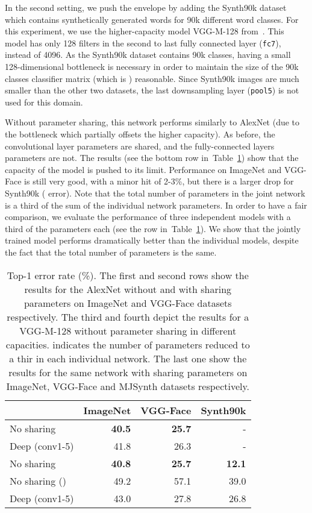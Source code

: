 \documentclass[10pt,twocolumn,letterpaper]{article}
\begin{document}
In the second setting, we push the envelope by adding the Synth90k dataset which contains synthetically generated words for 90k different word classes. For this experiment, we use the higher-capacity model VGG-M-128 from~\cite{chatfield14return}. This model has only 128 filters in the second to last fully connected layer (\texttt{fc7}), instead of 4096. As the Synth90k dataset contains 90k classes, having a small 128-dimensional bottleneck is necessary in order to maintain the size  of the 90k classes classifier matrix (which is ) reasonable. Since Synth90k images are much smaller than the other two datasets, the last downsampling layer ({\tt pool5}) is not used for this domain.

Without parameter sharing, this network performs similarly to AlexNet (due to the bottleneck which partially offsets the higher capacity). As before, the convolutional layer parameters are shared, and the fully-connected layers parameters are not. The results (see the bottom row in~Table~\ref{tab:largedatasets}) show that the capacity of the model is pushed to its limit. Performance on ImageNet and VGG-Face is still very good, with a minor hit of 2-3\%, but there is a larger drop for Synth90k ( error). Note that the total number of parameters in the joint network is a third of the sum of the individual network parameters. In order to have a fair comparison, we evaluate the performance of three independent models with a third of the parameters each (see the  row in~Table~\ref{tab:largedatasets}). We show that the jointly trained model performs dramatically better than the individual models, despite the fact that the total number of parameters is the same.


\begin{table}
  \centering
  \begin{tabular}{lrrr}
	  \toprule
    & ImageNet & VGG-Face & Synth90k\\
    \midrule
  No sharing & \bf{40.5} & \bf{25.7} & -\\
  Deep (conv1-5) & 41.8 & 26.3 & -\\
  \midrule
  No sharing & \bf{40.8} & \bf{25.7} & \bf{12.1}\\
  No sharing () & 49.2 & 57.1 & 39.0\\
  Deep (conv1-5) & 43.0 & 27.8 & 26.8\\
  \bottomrule
  \end{tabular}
  \caption{Top-1 error rate (\%). The first and second rows show the results for the AlexNet without and with sharing parameters on ImageNet and VGG-Face datasets respectively. The third and fourth depict the results for a VGG-M-128 without parameter sharing in different capacities.  indicates the number of parameters reduced to a thir in each individual network. The last one show the results for the same network with sharing parameters on ImageNet, VGG-Face and MJSynth datasets respectively. }
  \label{tab:largedatasets}
\end{table} 
\end{document}
